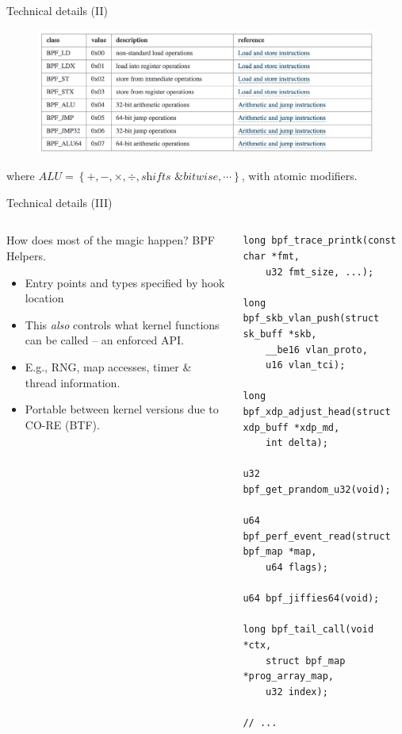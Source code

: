 \documentclass[aspectratio=169,xcolor={dvipsnames}
,handout %
]{beamer}
\begin{document}
\begin{frame}{Technical details (II)}
	\begin{figure}
		\includegraphics[keepaspectratio,max width=0.9\linewidth]{images/cmds}
	\end{figure}
	where $\textit{ALU}=\left\{+,-,\times,\div,\textit{shifts \& bitwise},\cdots\right\}$, with atomic modifiers.
\end{frame}

\begin{frame}[fragile]{Technical details (III)}
	\begin{columns}
		\begin{column}{0.5\linewidth}
			How does most of the magic happen? \alert{BPF Helpers.}
			\begin{itemize}[<+->]
				\item Entry points and types specified by hook location
				\item This \emph{also} controls what kernel functions can be called -- an enforced API.
				\item E.g., RNG, map accesses, timer \& thread information.
				\item Portable between kernel versions due to \alert{CO-RE} (BTF).
			\end{itemize}
		\end{column}
	\begin{column}{0.5\linewidth}
		\begin{verbatim}
long bpf_trace_printk(const char *fmt,
	u32 fmt_size, ...);

long bpf_skb_vlan_push(struct sk_buff *skb,
	__be16 vlan_proto,
	u16 vlan_tci);

long bpf_xdp_adjust_head(struct xdp_buff *xdp_md,
	int delta);

u32 bpf_get_prandom_u32(void);

u64 bpf_perf_event_read(struct bpf_map *map,
	u64 flags);

u64 bpf_jiffies64(void);

long bpf_tail_call(void *ctx,
	struct bpf_map *prog_array_map,
	u32 index);
	
// ...
		\end{verbatim}
	\end{column}
	\end{columns}
	
\end{frame}
\end{document}
